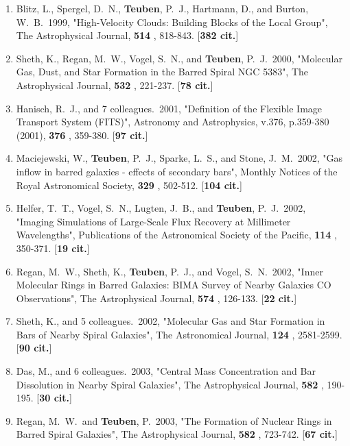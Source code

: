 \documentclass[11pt,letterpaper]{article}
\begin{document}
\begin{enumerate}[label=\textbf{\arabic*}.]
\item  
Blitz, L., Spergel, D.~N., {\bf Teuben}, P.~J., Hartmann, D., and Burton, W.~B.\  
1999,  "High-Velocity Clouds: Building Blocks of the Local Group", The 
Astrophysical Journal,  {\bf 514} , 818-843.  [{\bf 382 cit.}] 

\item  
Sheth, K., Regan, M.~W., Vogel, S.~N., and {\bf Teuben}, P.~J.\  2000,  
"Molecular Gas, Dust, and Star Formation in the Barred Spiral NGC 5383", 
The Astrophysical Journal,  {\bf 532} , 221-237.  [{\bf 78 cit.}] 

\item  
Hanisch, R.~J., and 7 colleagues.\  2001,  "Definition of the Flexible 
Image Transport System (FITS)", Astronomy and Astrophysics, v.376, 
p.359-380 (2001),  {\bf 376} , 359-380.  [{\bf 97 cit.}] 

\item  
Maciejewski, W., {\bf Teuben}, P.~J., Sparke, L.~S., and Stone, J.~M.\  2002,  
"Gas inflow in barred galaxies - effects of secondary bars", Monthly 
Notices of the Royal Astronomical Society,  {\bf 329} , 502-512.  [{\bf 104 
cit.}] 

\item  
Helfer, T.~T., Vogel, S.~N., Lugten, J.~B., and {\bf Teuben}, P.~J.\  2002,  
"Imaging Simulations of Large-Scale Flux Recovery at Millimeter 
Wavelengths", Publications of the Astronomical Society of the Pacific,  
{\bf 114} , 350-371.  [{\bf 19 cit.}] 

\item  
Regan, M.~W., Sheth, K., {\bf Teuben}, P.~J., and Vogel, S.~N.\  2002,  "Inner 
Molecular Rings in Barred Galaxies: BIMA Survey of Nearby Galaxies CO 
Observations", The Astrophysical Journal,  {\bf 574} , 126-133.  [{\bf 22 
cit.}] 

\item  
Sheth, K., and 5 colleagues.\  2002,  "Molecular Gas and Star Formation in 
Bars of Nearby Spiral Galaxies", The Astronomical Journal,  {\bf 124} , 
2581-2599.  [{\bf 90 cit.}] 

\item  
Das, M., and 6 colleagues.\  2003,  "Central Mass Concentration and Bar 
Dissolution in Nearby Spiral Galaxies", The Astrophysical Journal,  {\bf 
582} , 190-195.  [{\bf 30 cit.}] 

\item  
Regan, M.~W.~and {\bf Teuben}, P.\  2003,  "The Formation of Nuclear Rings in 
Barred Spiral Galaxies", The Astrophysical Journal,  {\bf 582} , 723-742.  
[{\bf 67 cit.}] 


\end{enumerate}
\end{document}
